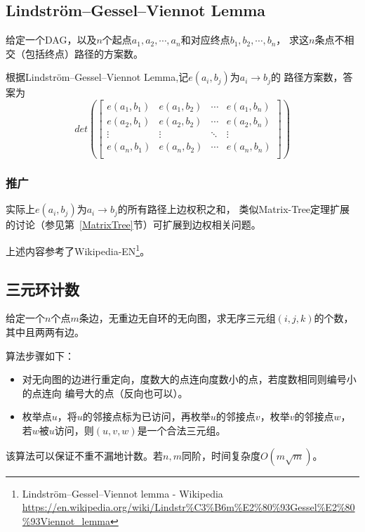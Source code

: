 \subsection{Lindström–Gessel–Viennot Lemma}
给定一个DAG，以及$n$个起点$a_1,a_2,\cdots,a_n$和对应终点$b_1,b_2,\cdots,b_n$，
求这$n$条点不相交（包括终点）路径的方案数。

根据Lindström–Gessel–Viennot Lemma,记$e(a_i,b_j)$为$a_i\rightarrow b_j$的
路径方案数，答案为\begin{displaymath}
	det\left(\left[\begin{array}{cccc}
			e(a_1,b_1) & e(a_1,b_2) & \cdots & e(a_1,b_n) \\
			e(a_2,b_1) & e(a_2,b_2) & \cdots & e(a_2,b_n) \\
			\vdots     & \vdots     & \ddots & \vdots     \\
			e(a_n,b_1) & e(a_n,b_2) & \cdots & e(a_n,b_n) \\
		\end{array}\right]\right)
\end{displaymath}
\subsubsection{推广}
实际上$e(a_i,b_j)$为$a_i\rightarrow b_j$的所有路径上边权积之和，
类似Matrix-Tree定理扩展的讨论（参见第~\ref{MatrixTree}节）可扩展到边权相关问题。

上述内容参考了Wikipedia-EN\footnote{
	Lindström–Gessel–Viennot lemma - Wikipedia
	\url{https://en.wikipedia.org/wiki/Lindstr\%C3\%B6m\%E2\%80\%93Gessel\%E2\%80\%93Viennot\_lemma}
}。
\subsection{三元环计数}
给定一个$n$个点$m$条边，无重边无自环的无向图，求无序三元组$(i,j,k)$的个数，其中且两两有边。

算法步骤如下：
\begin{itemize}
	\item 对无向图的边进行重定向，度数大的点连向度数小的点，若度数相同则编号小的点连向
	编号大的点（反向也可以）。
	\item 枚举点$u$，将$u$的邻接点标为已访问，再枚举$u$的邻接点$v$，枚举$v$的邻接点$w$，
	若$w$被$u$访问，则$(u,v,w)$是一个合法三元组。
\end{itemize}

该算法可以保证不重不漏地计数。若$n,m$同阶，时间复杂度$O(m\sqrt{m})$。

